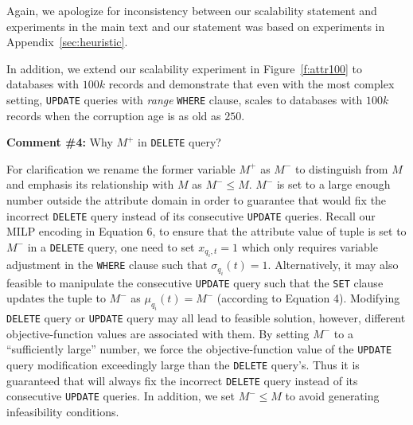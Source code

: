 Again, we apologize for inconsistency between our scalability statement and
experiments in the main text and our statement was based on experiments in
Appendix~\ref{sec:heuristic}.

In addition, we extend our scalability experiment in Figure~\ref{f:attr100} to
databases with $100k$ records and demonstrate that even with the most complex
setting, \texttt{UPDATE} queries with \textit{range} \texttt{WHERE} clause,
\sys scales to databases with $100k$ records when the corruption age is as old
as $250$.



\comskip

\noindent
\textbf{Comment \#4:} Why $M^+$ in \texttt{DELETE} query?
\begin{quote}
\end{quote}


For clarification we rename the former variable $M^+$ as $M^-$ to distinguish
from $M$ and emphasis its relationship with $M$ as $M^- \leq M$. $M^-$ is set
to a large enough number outside the attribute domain in order to guarantee
that \sys would fix the incorrect \texttt{DELETE} query instead of its
consecutive \texttt{UPDATE} queries. Recall our MILP encoding in Equation 6,
to ensure that the attribute value of tuple is set to $M^-$ in a
\texttt{DELETE} query, one need to set $x_{q_i,t} = 1$ which only requires
variable adjustment in the \texttt{WHERE} clause such that $\sigma_{q_i}(t) =
1$. Alternatively, it may also feasible to manipulate the consecutive
\texttt{UPDATE} query such that the \texttt{SET} clause updates the tuple to
$M^-$ as $\mu_{q_i}(t) = M^-$ (according to Equation 4). Modifying
\texttt{DELETE} query or \texttt{UPDATE} query may all lead to feasible
solution, however, different objective-function values are associated with
them. By setting $M^-$ to a ``sufficiently large'' number, we force the
objective-function value of the \texttt{UPDATE} query modification exceedingly
large than the \texttt{DELETE} query's. Thus it is guaranteed that \sys will
always fix the incorrect \texttt{DELETE} query instead of its consecutive
\texttt{UPDATE} queries. In addition, we set $M^- \leq M$ to avoid generating
infeasibility conditions.

